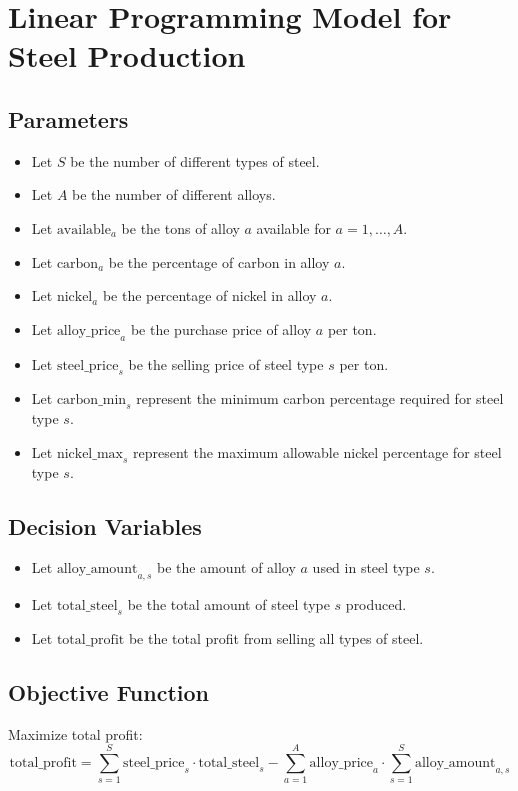 \documentclass{article}
\begin{document}
\section*{Linear Programming Model for Steel Production}

\subsection*{Parameters}
\begin{itemize}
    \item Let \( S \) be the number of different types of steel.
    \item Let \( A \) be the number of different alloys.
    \item Let \( \text{available}_{a} \) be the tons of alloy \( a \) available for \( a = 1, \ldots, A \).
    \item Let \( \text{carbon}_{a} \) be the percentage of carbon in alloy \( a \).
    \item Let \( \text{nickel}_{a} \) be the percentage of nickel in alloy \( a \).
    \item Let \( \text{alloy\_price}_{a} \) be the purchase price of alloy \( a \) per ton.
    \item Let \( \text{steel\_price}_{s} \) be the selling price of steel type \( s \) per ton.
    \item Let \( \text{carbon\_min}_{s} \) represent the minimum carbon percentage required for steel type \( s \).
    \item Let \( \text{nickel\_max}_{s} \) represent the maximum allowable nickel percentage for steel type \( s \).
\end{itemize}

\subsection*{Decision Variables}
\begin{itemize}
    \item Let \( \text{alloy\_amount}_{a,s} \) be the amount of alloy \( a \) used in steel type \( s \).
    \item Let \( \text{total\_steel}_{s} \) be the total amount of steel type \( s \) produced.
    \item Let \( \text{total\_profit} \) be the total profit from selling all types of steel.
\end{itemize}

\subsection*{Objective Function}
Maximize total profit:
\[
\text{total\_profit} = \sum_{s=1}^{S} \text{steel\_price}_{s} \cdot \text{total\_steel}_{s} - \sum_{a=1}^{A} \text{alloy\_price}_{a} \cdot \sum_{s=1}^{S} \text{alloy\_amount}_{a,s}
\]
\end{document}
